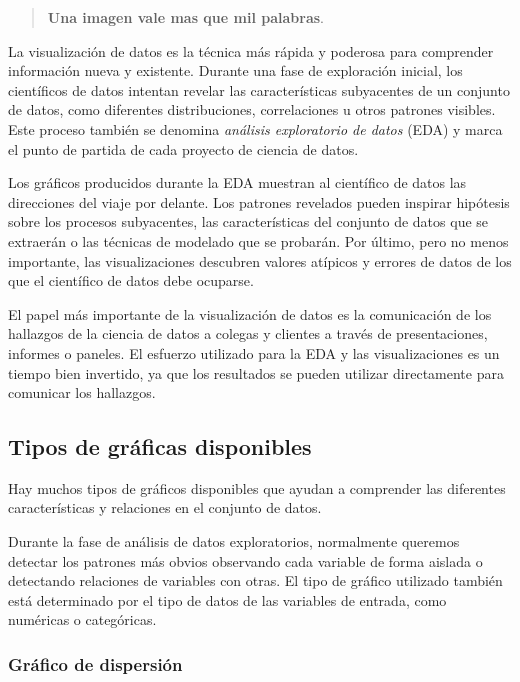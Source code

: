\documentclass[
]{book}
\begin{document}
\begin{quote}
\textbf{Una imagen vale mas que mil palabras}.
\end{quote}

La visualización de datos es la técnica más rápida y poderosa para comprender información nueva y existente. Durante una fase de exploración inicial, los científicos de datos intentan revelar las características subyacentes de un conjunto de datos, como diferentes distribuciones, correlaciones u otros patrones visibles. Este proceso también se denomina \emph{análisis exploratorio de datos} (EDA) y marca el punto de partida de cada proyecto de ciencia de datos.

Los gráficos producidos durante la EDA muestran al científico de datos las direcciones del viaje por delante. Los patrones revelados pueden inspirar hipótesis sobre los procesos subyacentes, las características del conjunto de datos que se extraerán o las técnicas de modelado que se probarán. Por último, pero no menos importante, las visualizaciones descubren valores atípicos y errores de datos de los que el científico de datos debe ocuparse.

El papel más importante de la visualización de datos es la comunicación de los hallazgos de la ciencia de datos a colegas y clientes a través de presentaciones, informes o paneles. El esfuerzo utilizado para la EDA y las visualizaciones es un tiempo bien invertido, ya que los resultados se pueden utilizar directamente para comunicar los hallazgos.

\hypertarget{tipos-de-gruxe1ficas-disponibles}{%
\subsection{Tipos de gráficas disponibles}\label{tipos-de-gruxe1ficas-disponibles}}

Hay muchos tipos de gráficos disponibles que ayudan a comprender las diferentes características y relaciones en el conjunto de datos.

Durante la fase de análisis de datos exploratorios, normalmente queremos detectar los patrones más obvios observando cada variable de forma aislada o detectando relaciones de variables con otras. El tipo de gráfico utilizado también está determinado por el tipo de datos de las variables de entrada, como numéricas o categóricas.

\hypertarget{gruxe1fico-de-dispersiuxf3n}{%
\subsubsection{Gráfico de dispersión}\label{gruxe1fico-de-dispersiuxf3n}}
\end{document}

